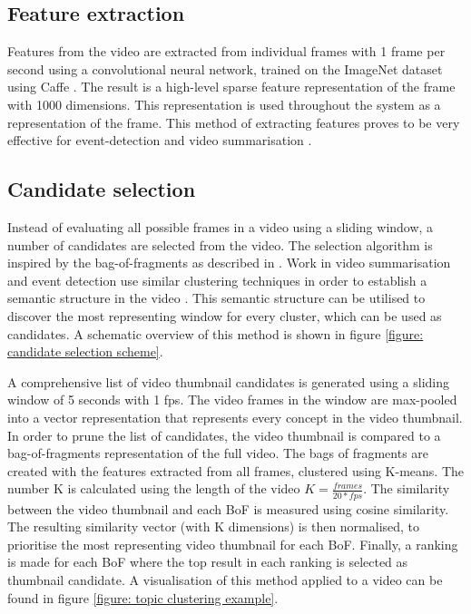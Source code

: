 \documentclass{../resources/sig-alternate-05-2015}
\begin{document}
\subsection{Feature extraction}
\label{section: feature extraction}
Features from the video are extracted from individual frames with 1 frame per second using a convolutional neural network, trained on the ImageNet dataset \cite{Krizhevsky:2012wl} using Caffe \cite{Jia:2014cm}. The result is a high-level sparse feature representation of the frame with 1000 dimensions. This representation is used throughout the system as a representation of the frame. This method of extracting features proves to be very effective for event-detection \cite{Habibian:2013ks,Althoff:2012gf,Jiang:2012fy} and video summarisation \cite{Ajmal:2012hi,Mazloom:2015el}.

\subsection{Candidate selection}
\label{section: candidate selection}

Instead of evaluating all possible frames in a video using a sliding window, a number of candidates are selected from the video. The selection algorithm is inspired by the bag-of-fragments as described in \cite{Mettes:2015vg}. Work in video summarisation and event detection use similar clustering techniques in order to establish a semantic structure in the video \cite{Yuan:2011fu,Habibian:2014dc}. This semantic structure can be utilised to discover the most representing window for every cluster, which can be used as candidates. A schematic overview of this method is shown in figure \ref{figure: candidate selection scheme}.

A comprehensive list of video thumbnail candidates is generated using a sliding window of 5 seconds with 1 fps. The video frames in the window are max-pooled into a vector representation that represents every concept in the video thumbnail. In order to prune the list of candidates, the video thumbnail is compared to a bag-of-fragments representation of the full video. The bags of fragments are created with the features extracted from all frames, clustered using K-means. The number K is calculated using the length of the video $K = \frac{frames}{20 * fps}$. The similarity between the video thumbnail and each BoF is measured using cosine similarity. The resulting similarity vector (with K dimensions) is then normalised, to prioritise the most representing video thumbnail for each BoF. Finally, a ranking is made for each BoF where the top result in each ranking is selected as thumbnail candidate. A visualisation of this method applied to a video can be found in figure \ref{figure: topic clustering example}.
\end{document}

